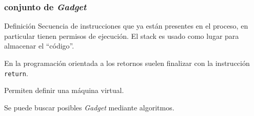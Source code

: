 \documentclass{beamer}
\newcommand { \return } {\texttt{return}\xspace}
\newcommand { \vs } {\vspace{0.5cm}}
\begin{document}
\begin{frame}
    \frametitle{conjunto de \textit{Gadget}}
    \begin{block}{Definición}
        Secuencia de instrucciones que {ya están presentes en el proceso}, en particular tienen permisos de ejecución. El stack es usado como lugar para almacenar el ``código''.
    \end{block}

    En la programación orientada a los retornos suelen finalizar con la instrucción \return.\vs

    Permiten definir una máquina virtual.\vs
    
    \pause
    
    Se puede buscar posibles \textit{Gadget} mediante algoritmos.

\end{frame}
\end{document}
